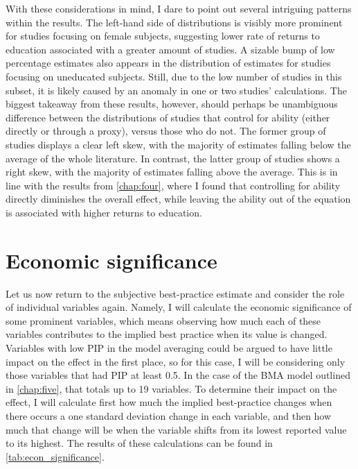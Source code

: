 With these considerations in mind, I dare to point out several intriguing patterns within the results. The left-hand side of distributions is visibly more prominent for studies focusing on female subjects, suggesting lower rate of returns to education associated with a greater amount of studies. A sizable bump of low percentage estimates also appears in the distribution of estimates for studies focusing on uneducated subjects. Still, due to the low number of studies in this subset, it is likely caused by an anomaly in one or two studies' calculations. The biggest takeaway from these results, however, should perhaps be unambiguous difference between the distributions of studies that control for ability (either directly or through a proxy), versus those who do not. The former group of studies displays a clear left skew, with the majority of estimates falling below the average of the whole literature. In contrast, the latter group of studies shows a right skew, with the majority of estimates falling above the average. This is in line with the results from \autoref{chap:four}, where I found that controlling for ability directly diminishes the overall effect, while leaving the ability out of the equation is associated with higher returns to education.

\section{Economic significance}
\label{sec:economic_significance}


Let us now return to the subjective best-practice estimate and consider the role of individual variables again. Namely, I will calculate the economic significance of some prominent variables, which means observing how much each of these variables contributes to the implied best practice when its value is changed. Variables with low \ac{PIP} in the model averaging could be argued to have little impact on the effect in the first place, so for this case, I will be considering only those variables that had \ac{PIP} at least 0.5. In the case of the \ac{BMA} model outlined in \autoref{chap:five}, that totals up to 19 variables. To determine their impact on the effect, I will calculate first how much the implied best-practice changes when there occurs a one standard deviation change in each variable, and then how much that change will be when the variable shifts from its lowest reported value to its highest. The results of these calculations can be found in \autoref{tab:econ_significance}.

